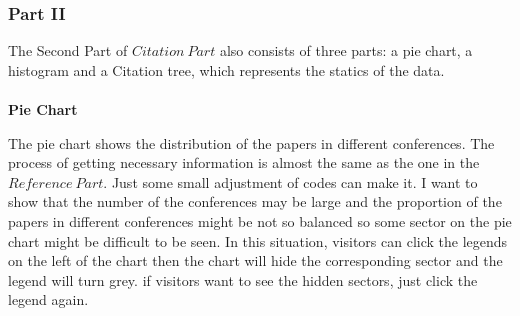 \documentclass{article}
\begin{document}
	\subsubsection{Part II}
	The Second Part of \(Citation\ Part\) also consists of three parts:  a pie chart, a histogram and a Citation tree, which represents the statics of the data.
	\\
	\\
	\textbf{Pie Chart}
	\par The pie chart shows the distribution of the papers in different conferences. The process of getting necessary information is almost the same as the one in the \(Reference\ Part\). Just some small adjustment of codes can make it. I want to show that the number of the conferences may be large and the proportion of the papers in different conferences might be not so balanced so some sector on the pie chart might be difficult to be seen. In this situation, visitors can click the legends on the left of the chart then the chart will hide the corresponding sector and the legend will turn grey. if visitors want to see the hidden sectors, just click the legend again.
\end{document}
